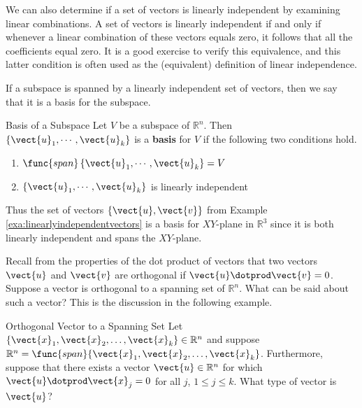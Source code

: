 We can also determine if a set of vectors is linearly independent by examining linear combinations. A set of vectors is linearly independent if and only if
whenever a linear combination of these vectors equals zero, it follows
that all the coefficients equal zero. It is a good exercise to verify
this equivalence, and this latter condition is often used as the
(equivalent) definition of linear independence.

If a subspace is spanned by a linearly independent set of vectors,
then we say that it is a basis for the subspace.

\begin{definition}{Basis of a Subspace}\label{def:subspacebasis}
Let $V$ be a subspace of $\mathbb{R}^{n}$. Then $\left\{
\vect{u}_{1},\cdots ,\vect{u}_{k}\right\} $ is a \textbf{basis} for
$V$ if the following two conditions
hold. 

\begin{enumerate}
\item $\func{span}\left\{ \vect{u}_{1},\cdots ,\vect{u}_{k}\right\} =V$
\item $\left\{ \vect{u}_{1},\cdots ,\vect{u}_{k}\right\} $ is linearly
independent
\end{enumerate}
\end{definition}

Thus the set of vectors $\{\vect{u}, \vect{v}\}$ from Example
\ref{exa:linearlyindependentvectors} is a basis for $XY$-plane in
$\mathbb{R}^{3}$ since it is both linearly independent and spans
the $XY$-plane.

 Recall from the properties of the dot product of vectors 
that two vectors $\vect{u}$ and $\vect{v}$ are orthogonal if $\vect{u}
\dotprod \vect{v} = 0$. Suppose a vector is orthogonal to a spanning set of $\mathbb{R}^n$. What can be said about such a vector? This is the discussion in the following example.

\begin{example}{Orthogonal Vector to a Spanning Set}
Let $\{\vect{x}_1, \vect{x}_2, \ldots, \vect{x}_k\}\in\mathbb{R}^n$ and
suppose $\mathbb{R}^n=\func{span}\{\vect{x}_1, \vect{x}_2, \ldots, \vect{x}_k\}$.
Furthermore, suppose that there exists a vector $\vect{u}\in\mathbb{R}^n$ for which $\vect{u}\dotprod \vect{x}_j=0$ for all $j$, $1\leq j\leq k$.
What type of vector is $\vect{u}$?
\end{example}

